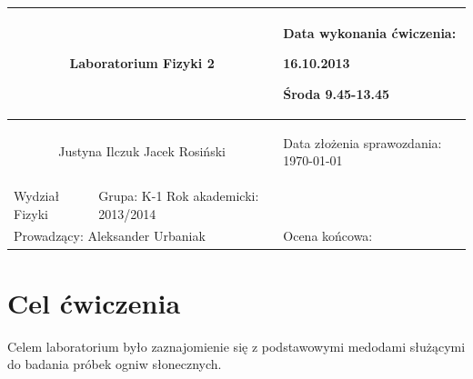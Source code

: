\documentclass[a4paper,12pt]{article}
\author{Justyna Ilczuk, Jacek Rosiński}
\begin{document}
\begin{center}

    \begin{tabular}{ | m{5cm}| m{5cm} | m{5cm} |}
    \hline 
    \multicolumn{2}{|c|}{{ \Large \textbf{Laboratorium Fizyki 2}} }
    &  
    \begin{center}
    Data wykonania ćwiczenia:
    \end{center}
    \begin{center}
      16.10.2013 
    \end{center}
    \begin{center}
    Środa 9.45-13.45
    \end{center}
     \\ 
    
    \hline
    \multicolumn{2}{|c|}{Justyna Ilczuk \newline Jacek Rosiński}
    & \begin{center}
    {\small Data złożenia sprawozdania:} \newline \today
    \end{center}   \\
   	
   	\hline
    Wydział Fizyki & Grupa: K-1 \newline Rok akademicki: 2013/2014 &  \\
   	\hline
   	\multicolumn{2}{|l|}{Prowadzący: Aleksander Urbaniak} & \multicolumn{1}{|l|}{Ocena końcowa:}\\
    \hline
    \end{tabular}
\end{center}

\newpage

\pagestyle{fancy}
\fancyfoot[CO]{\ }
\fancyhead[RO]{\footnotesize{\thepage} }




\section{Cel ćwiczenia}
Celem laboratorium było zaznajomienie się z podstawowymi medodami służącymi do badania próbek ogniw słonecznych.
\end{document}
